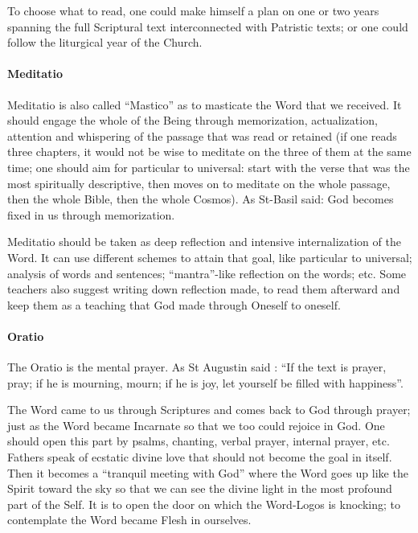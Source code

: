 To choose what to read, one could make himself a plan on one or two years spanning the full Scriptural text interconnected with Patristic texts; or one could follow the liturgical year of the Church.

\paragraph{Meditatio}
Meditatio is also called ``Mastico” as to masticate the Word that we received. It should engage the whole of the Being through memorization, actualization, attention and whispering of the passage that was read or retained (if one reads three chapters, it would not be wise to meditate on the three of them at the same time; one should aim for particular to universal: start with the verse that was the most spiritually descriptive, then moves on to meditate on the whole passage, then the whole Bible, then the whole Cosmos). As St-Basil said: God becomes fixed in us through memorization.

Meditatio should be taken as deep reflection and intensive internalization of the Word. It can use different schemes to attain that goal, like particular to universal; analysis of words and sentences; ``mantra”-like reflection on the words; etc. Some teachers also suggest writing down reflection made, to read them afterward and keep them as a teaching that God made through Oneself to oneself.

\paragraph{Oratio}
The Oratio is the mental prayer. As St Augustin said : ``If the text is prayer, pray; if he is mourning, mourn; if he is joy, let yourself be filled with happiness”.

The Word came to us through Scriptures and comes back to God through prayer; just as the Word became Incarnate so that we too could rejoice in God. One should open this part by psalms, chanting, verbal prayer, internal prayer, etc. Fathers speak of ecstatic divine love that should not become the goal in itself. Then it becomes a ``tranquil meeting with God” where the Word goes up like the Spirit toward the sky so that we can see the divine light in the most profound part of the Self. It is to open the door on which the Word-Logos is knocking; to contemplate the Word became Flesh in ourselves.

